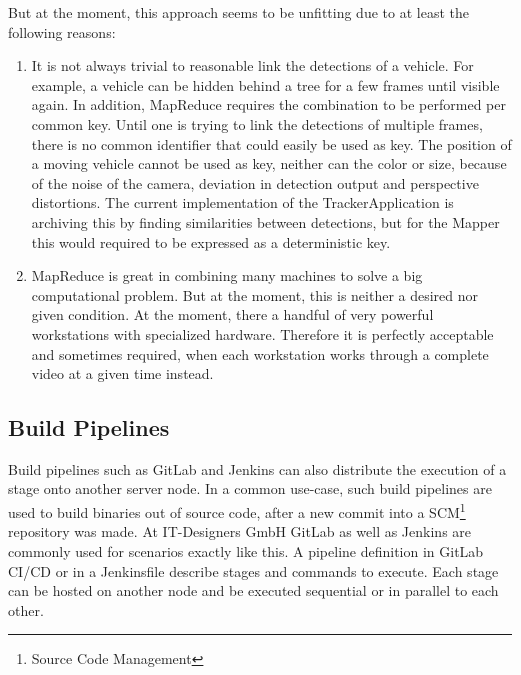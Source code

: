But at the moment, this approach seems to be unfitting due to at least the following reasons:

\begin{enumerate}
	\item It is not always trivial to reasonable link the detections of a vehicle.
	For example, a vehicle can be hidden behind a tree for a few frames until visible again.
	In addition, MapReduce requires the combination to be performed per common key.
	Until one is trying to link the detections of multiple frames, there is no common identifier that could easily be used as key.
	The position of a moving vehicle cannot be used as key, neither can the color or size, because of the noise of the camera, deviation in detection output and perspective distortions.
	The current implementation of the TrackerApplication is archiving this by finding similarities between detections, but for the Mapper this would required to be expressed as a deterministic key.
	\item MapReduce is great in combining many machines to solve a big computational problem.
	But at the moment, this is neither a desired nor given condition. At the moment, there a handful of very powerful workstations with specialized hardware.
	Therefore it is perfectly acceptable and sometimes required, when each workstation works through a complete video at a given time instead.
\end{enumerate}

\subsection{Build Pipelines}

Build pipelines such as GitLab\cite{gitlab:main} and Jenkins\cite{jenkins:main} can also distribute the execution of a stage onto another server node.
In a common use-case, such build pipelines are used to build binaries out of source code, after a new commit into a SCM\footnote{Source Code Management} repository was made.
At IT-Designers GmbH GitLab as well as Jenkins are commonly used for scenarios exactly like this.
A pipeline definition in GitLab CI/CD \cite{gitlab:ci:yaml} or in a Jenkinsfile \cite{jenkins:pipeline:jenkinsfile} describe stages and commands to execute.
Each stage can be hosted on another node and be executed sequential or in parallel to each other.

